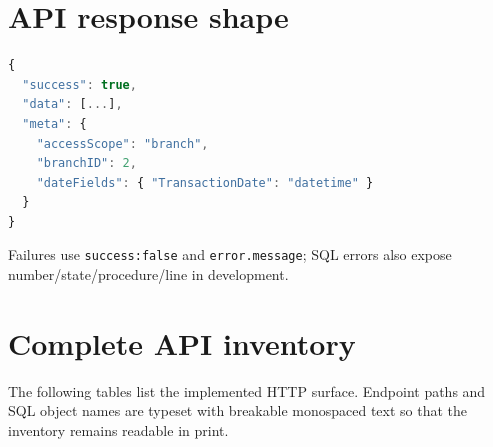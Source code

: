 \documentclass[11pt,a4paper,oneside]{report}
\begin{document}
\section{API response shape}
\begin{lstlisting}[language=JavaScript]
{
  "success": true,
  "data": [...],
  "meta": {
    "accessScope": "branch",
    "branchID": 2,
    "dateFields": { "TransactionDate": "datetime" }
  }
}
\end{lstlisting}
Failures use \texttt{success:false} and \texttt{error.message}; SQL errors also expose number/state/procedure/line in development.

\section{Complete API inventory}
The following tables list the implemented HTTP surface. Endpoint paths and SQL object names are typeset with breakable monospaced text so that the inventory remains readable in print.
\end{document}
